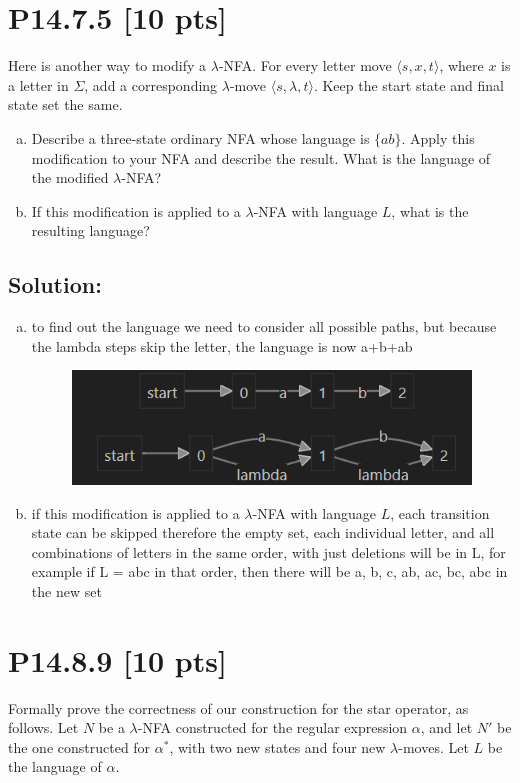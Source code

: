 \documentclass[12pt]{article}
\begin{document}
\newpage
\section*{\textbf{P14.7.5} [10 pts]}
Here is another way to modify a $\lambda$-NFA. For every letter move $\langle s, x, t \rangle$, where $x$ is a letter in $\Sigma$, add a corresponding $\lambda$-move $\langle s, \lambda, t \rangle$. Keep the start state and final state set the same.

\begin{enumerate}[(a)]
    \item Describe a three-state ordinary NFA whose language is $\{ab\}$. Apply this modification to your NFA and describe the result. What is the language of the modified $\lambda$-NFA?

    \item If this modification is applied to a $\lambda$-NFA with language $L$, what is the resulting language?

\end{enumerate}


\subsection*{\textbf{Solution:}}
\begin{enumerate}[(a)]
    \item to find out the language we need to consider all possible paths, but because the lambda steps skip the letter, the language is now a+b+ab
    \begin{figure}[h]
        \centering
        \includegraphics[width=.5\linewidth]{fig2.png}
    \end{figure}

    \item if this modification is applied to a $\lambda$-NFA with language $L$, each transition state can be skipped therefore the empty set, each individual letter, and all combinations of letters in the same order, with just deletions will be in L, for example if L = abc in that order, then there will be a, b, c, ab, ac, bc, abc in the new set
\end{enumerate}


\newpage
\section*{\textbf{P14.8.9} [10 pts]}
Formally prove the correctness of our construction for the star operator, as follows. Let $N$ be a $\lambda$-NFA constructed for the regular expression $\alpha$, and let $N'$ be the one constructed for $\alpha^*$, with two new states and four new $\lambda$-moves. Let $L$ be the language of $\alpha$.
\end{document}
